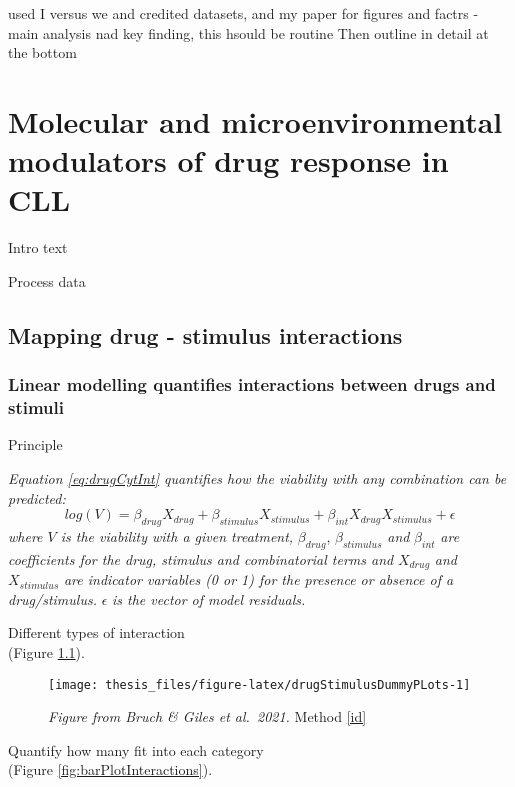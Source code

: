 \documentclass[11pt, a4paper, twosided]{book}
\begin{document}
used I versus we and credited datasets, and my paper for figures and factrs - main analysis nad key finding, this hsould be routine
Then outline in detail at the bottom

\hypertarget{molecular-and-microenvironmental-modulators-of-drug-response-in-cll}{%
\chapter{Molecular and microenvironmental modulators of drug response in CLL}\label{molecular-and-microenvironmental-modulators-of-drug-response-in-cll}}

Intro text

Process data

\hypertarget{mapping-drug---stimulus-interactions}{%
\section{Mapping drug - stimulus interactions}\label{mapping-drug---stimulus-interactions}}

\hypertarget{linear-modelling-quantifies-interactions-between-drugs-and-stimuli}{%
\subsection{Linear modelling quantifies interactions between drugs and stimuli}\label{linear-modelling-quantifies-interactions-between-drugs-and-stimuli}}

Principle

\emph{Equation \eqref{eq:drugCytInt} quantifies how the viability with any combination can be predicted:}
\begin{equation}
            log(V) = \beta_{drug}X_{drug} + \beta_{stimulus}X_{stimulus} + \beta_{int}X_{drug}X_{stimulus} + \epsilon
                                       \label{eq:drugCytInt}
    \end{equation}
\emph{where \(V\) is the viability with a given treatment,} \(\beta_{drug}\), \(\beta_{stimulus}\) \emph{and} \(\beta_{int}\) \emph{are coefficients for the drug, stimulus and combinatorial terms and} \(X_{drug}\) \emph{and} \(X_{stimulus}\) \emph{are indicator variables (0 or 1) for the presence or absence of a drug/stimulus.} \(\epsilon\) \emph{is the vector of model residuals.}

Different types of interaction\\
(Figure \ref{fig:drugStimulusDummyPLots}).


\begin{figure}

{\centering \texttt{[image: thesis\_files/figure-latex/drugStimulusDummyPLots-1]} 

}

\caption{\emph{Figure from Bruch \& Giles et al.~2021.} Method \ref{id}}\label{fig:drugStimulusDummyPLots}
\end{figure}
Quantify how many fit into each category\\
(Figure \ref{fig:barPlotInteractions}).
\end{document}
